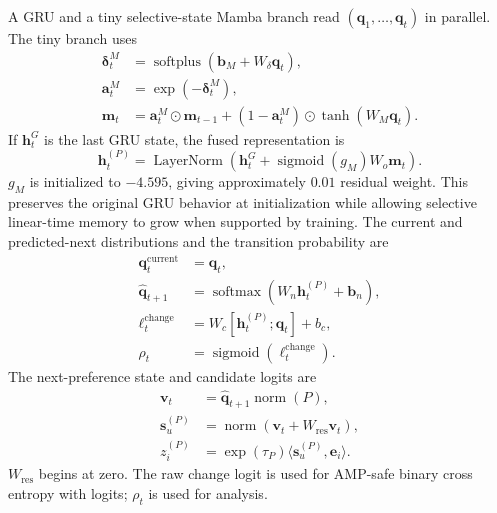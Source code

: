 \documentclass[11pt,a4paper]{article}
\newcommand{\softmax}{\operatorname{softmax}}
\newcommand{\sigmoid}{\operatorname{sigmoid}}
\begin{document}
A GRU and a tiny selective-state Mamba branch read
$(\bm q_1,\ldots,\bm q_t)$ in parallel. The tiny branch uses
\begin{align}
  \bm\delta_t^M&=\operatorname{softplus}(\bm b_M+W_\delta\bm q_t),\\
  \bm a_t^M&=\exp(-\bm\delta_t^M),\\
  \bm m_t&=\bm a_t^M\odot\bm m_{t-1}
    +(1-\bm a_t^M)\odot\tanh(W_M\bm q_t).
\end{align}
If $\bm h_t^G$ is the last GRU state, the fused representation is
\begin{equation}
  \bm h_t^{(P)}
  =\operatorname{LayerNorm}
    (\bm h_t^G+\sigmoid(g_M)W_o\bm m_t).
\end{equation}
$g_M$ is initialized to $-4.595$, giving approximately $0.01$ residual
weight. This preserves the original GRU behavior at initialization while
allowing selective linear-time memory to grow when supported by training.
The current and predicted-next distributions and the
transition probability are
\begin{align}
  \bm q_t^{\mathrm{current}} &= \bm q_t,\\
  \widehat{\bm q}_{t+1}
    &=\softmax(W_n\bm h_t^{(P)}+\bm b_n),\\
  \ell_t^{\mathrm{change}}
    &=W_c[\bm h_t^{(P)};\bm q_t]+b_c,\\
  \rho_t&=\sigmoid(\ell_t^{\mathrm{change}}).
\end{align}
The next-preference state and candidate logits are
\begin{align}
  \bm v_t&=\widehat{\bm q}_{t+1}\operatorname{norm}(P),\\
  \bm s_u^{(P)}
    &=\operatorname{norm}(\bm v_t+W_{\mathrm{res}}\bm v_t),\\
  z_i^{(P)}&=\exp(\tau_P)\langle\bm s_u^{(P)},\bm e_i\rangle.
\end{align}
$W_{\mathrm{res}}$ begins at zero. The raw change logit is used for
AMP-safe binary cross entropy with logits; $\rho_t$ is used for analysis.
\end{document}
